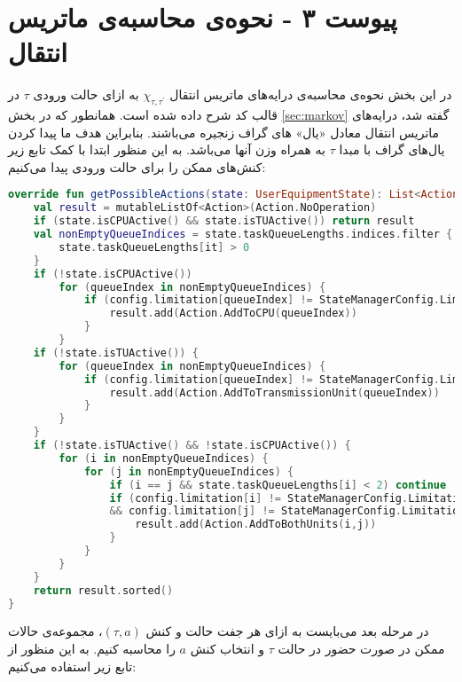 \chapter*{پیوست ۳ - نحوه‌ی محاسبه‌ی ماتریس انتقال}
\label{appendix:3}
در این بخش نحوه‌ی محاسبه‌ی درایه‌های ماتریس انتقال $\chi_{\tau, \tau^{\prime}}$ به ازای حالت ورودی $\tau$ در قالب کد شرح داده شده است. همانطور که در بخش \ref{sec:markov} گفته شد، درايه‌های ماتریس انتقال معادل «یال» های گراف زنجیره می‌باشند. بنابراین هدف ما پیدا کردن یال‌های گراف با مبدا $\tau$ به همراه وزن آنها می‌باشد. به این منظور ابتدا با کمک تابع زیر کنش‌های ممکن را برای حالت ورودی پیدا می‌کنیم:
\begin{latin}
	\begin{lstlisting}[language=Kotlin, title=\rl{تابع محاسبه‌ی کنش‌های ممکن به ازای حالت داده شده}]
override fun getPossibleActions(state: UserEquipmentState): List<Action> {
	val result = mutableListOf<Action>(Action.NoOperation)
	if (state.isCPUActive() && state.isTUActive()) return result
	val nonEmptyQueueIndices = state.taskQueueLengths.indices.filter { 
		state.taskQueueLengths[it] > 0 
	}
	if (!state.isCPUActive())
		for (queueIndex in nonEmptyQueueIndices) {
			if (config.limitation[queueIndex] != StateManagerConfig.Limitation.OffloadOnly) {
				result.add(Action.AddToCPU(queueIndex))
			}
		}
	if (!state.isTUActive()) {
		for (queueIndex in nonEmptyQueueIndices) {
			if (config.limitation[queueIndex] != StateManagerConfig.Limitation.LocalOnly) {
				result.add(Action.AddToTransmissionUnit(queueIndex))
			}
		}
	}
	if (!state.isTUActive() && !state.isCPUActive()) {
		for (i in nonEmptyQueueIndices) {
			for (j in nonEmptyQueueIndices) {
				if (i == j && state.taskQueueLengths[i] < 2) continue
				if (config.limitation[i] != StateManagerConfig.Limitation.OffloadOnly 
				&& config.limitation[j] != StateManagerConfig.Limitation.LocalOnly) {
					result.add(Action.AddToBothUnits(i,j))
				}
			}
		}
	}
	return result.sorted()
}
	\end{lstlisting}
\end{latin}
\newpage
در مرحله بعد می‌بایست به ازای هر جفت حالت و کنش $(\tau, a)$، مجموعه‌ی حالات ممکن در صورت حضور در حالت $\tau$ و انتخاب کنش $a$ را محاسبه کنیم. به این منظور از تابع زیر استفاده می‌کنیم:
